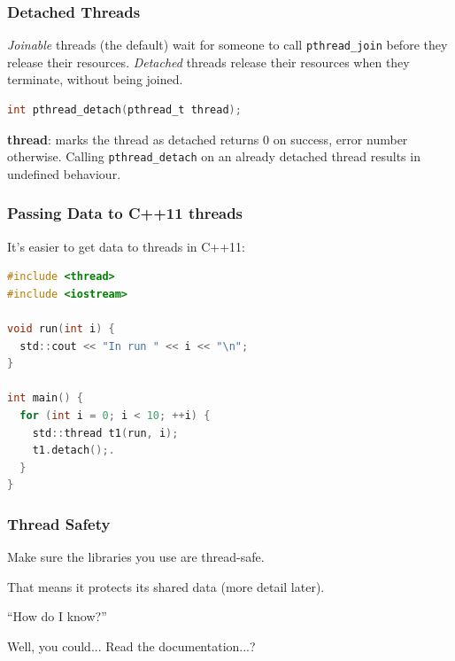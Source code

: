 \begin{frame}[fragile]
  \frametitle{Detached Threads}


  {\it Joinable} threads (the default) wait for someone to call
  {\tt pthread\_join} before they release their resources.
  \vfill
  {\it Detached} threads release their resources when they terminate, without
  being joined.
  \vfill
  \begin{lstlisting}[language=C]
int pthread_detach(pthread_t thread);
  \end{lstlisting}
  \vfill
  {\bf thread}: marks the thread as detached
  \vfill
  returns 0 on success, error number otherwise.
  \vfill
  Calling {\tt pthread\_detach} on an already detached thread results in undefined
  behaviour.


\end{frame}


\begin{frame}[fragile]
  \frametitle{Passing Data to C++11 threads}

It's easier to get data to threads in C++11:
\begin{lstlisting}[language=C]
#include <thread>
#include <iostream>

void run(int i) {
  std::cout << "In run " << i << "\n";
}

int main() {
  for (int i = 0; i < 10; ++i) {
    std::thread t1(run, i);
    t1.detach();.
  }
}
\end{lstlisting}

  
\end{frame}


\begin{frame}
\frametitle{Thread Safety}

Make sure the libraries you use are  \alert{thread-safe}.

That means it protects its shared data (more detail later).

``How do I know?''

Well, you could... Read the documentation...?


\end{frame}


